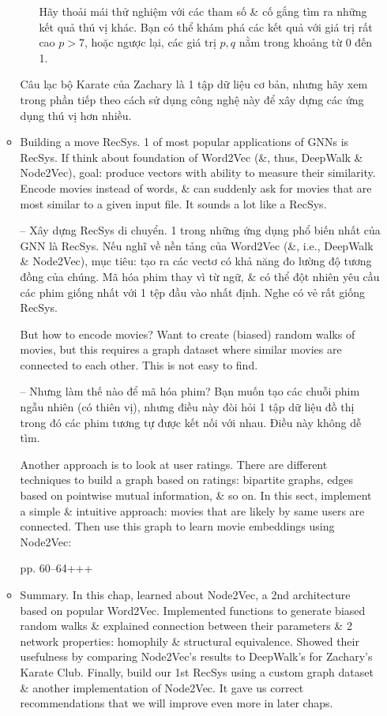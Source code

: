 \documentclass{article}
\begin{document}
\begin{itemize}
\begin{itemize}
\begin{itemize}
            Hãy thoải mái thử nghiệm với các tham số \& cố gắng tìm ra những kết quả thú vị khác. Bạn có thể khám phá các kết quả với giá trị rất cao $p > 7$, hoặc ngược lại, các giá trị $p,q$ nằm trong khoảng từ 0 đến 1.
        \end{itemize}
        Câu lạc bộ Karate của Zachary là 1 tập dữ liệu cơ bản, nhưng hãy xem trong phần tiếp theo cách sử dụng công nghệ này để xây dựng các ứng dụng thú vị hơn nhiều.
        \item {\sf Building a move RecSys.} 1 of most popular applications of GNNs is RecSys. If think about foundation of Word2Vec (\&, thus, DeepWalk \& Node2Vec), goal: produce vectors with ability to measure their similarity. Encode movies instead of words, \& can suddenly ask for movies that are most similar to a given input file. It sounds a lot like a RecSys.

        -- {\sf Xây dựng RecSys di chuyển.} 1 trong những ứng dụng phổ biến nhất của GNN là RecSys. Nếu nghĩ về nền tảng của Word2Vec (\&, i.e., DeepWalk \& Node2Vec), mục tiêu: tạo ra các vectơ có khả năng đo lường độ tương đồng của chúng. Mã hóa phim thay vì từ ngữ, \& có thể đột nhiên yêu cầu các phim giống nhất với 1 tệp đầu vào nhất định. Nghe có vẻ rất giống RecSys.

        But how to encode movies? Want to create (biased) random walks of movies, but this requires a graph dataset where similar movies are connected to each other. This is not easy to find.

        -- Nhưng làm thế nào để mã hóa phim? Bạn muốn tạo các chuỗi phim ngẫu nhiên (có thiên vị), nhưng điều này đòi hỏi 1 tập dữ liệu đồ thị trong đó các phim tương tự được kết nối với nhau. Điều này không dễ tìm.

        Another approach is to look at user ratings. There are different techniques to build a graph based on ratings: bipartite graphs, edges based on pointwise mutual information, \& so on. In this sect, implement a simple \& intuitive approach: movies that are likely by same users are connected. Then use this graph to learn movie embeddings using Node2Vec:

        pp. 60--64+++
        \item {\sf Summary.} In this chap, learned about Node2Vec, a 2nd architecture based on popular Word2Vec. Implemented functions to generate biased random walks \& explained connection between their parameters \& 2 network properties: homophily \& structural equivalence. Showed their usefulness by comparing Node2Vec's results to DeepWalk's for Zachary's Karate Club. Finally, build our 1st RecSys using a custom graph dataset \& another implementation of Node2Vec. It gave us correct recommendations that we will improve even more in later chaps.


\end{itemize}
\end{itemize}
\end{document}
